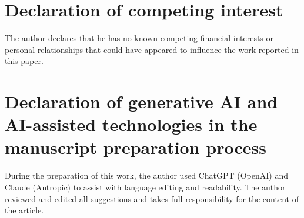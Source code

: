\documentclass[12pt]{article}
\theoremstyle{definition}
\begin{document}
\section*{Declaration of competing interest}
The author declares that he has no known competing financial interests or personal relationships that could have appeared to influence the work reported in this paper.

\section*{Declaration of generative AI and AI-assisted technologies
in the manuscript preparation process}
During the preparation of this work, the author used ChatGPT (OpenAI) and Claude (Antropic) to assist with language editing and readability. The author reviewed and edited all suggestions and takes full responsibility for the content of the article.
\end{document}

